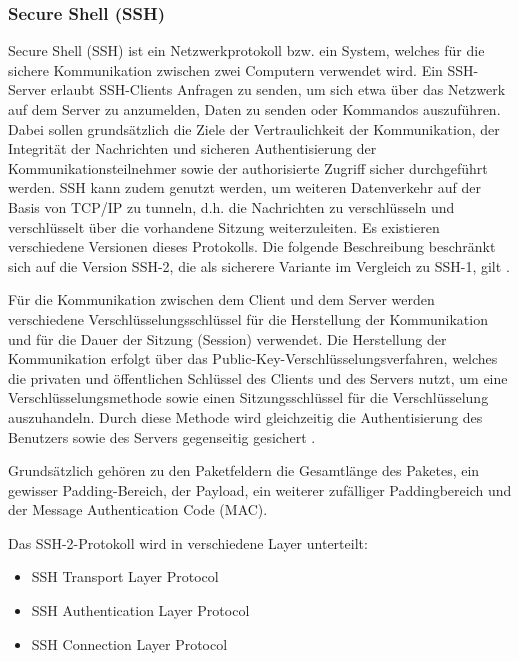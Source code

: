 \subsubsection{Secure Shell (SSH)}
Secure Shell (SSH) ist ein Netzwerkprotokoll bzw. ein System, welches für die sichere Kommunikation zwischen zwei Computern verwendet wird. Ein SSH-Server erlaubt SSH-Clients Anfragen zu senden, um sich etwa über das Netzwerk auf dem Server zu anzumelden, Daten zu senden oder Kommandos auszuführen. Dabei sollen grundsätzlich die Ziele der Vertraulichkeit der Kommunikation, der Integrität der Nachrichten und sicheren Authentisierung der Kommunikationsteilnehmer sowie der authorisierte Zugriff sicher durchgeführt werden. SSH kann zudem genutzt werden, um weiteren Datenverkehr auf der Basis von TCP/IP zu \glqq tunneln\grqq , d.h. die Nachrichten zu verschlüsseln und verschlüsselt über die vorhandene Sitzung weiterzuleiten. Es existieren verschiedene Versionen dieses Protokolls. Die folgende Beschreibung beschränkt sich auf die Version SSH-2, die als sicherere Variante im Vergleich zu SSH-1, gilt \citep{SSH1}.  %

Für die Kommunikation zwischen dem Client und dem Server werden verschiedene Verschlüsselungsschlüssel für die Herstellung der Kommunikation und für die Dauer der Sitzung (Session) verwendet. Die Herstellung der Kommunikation erfolgt über das Public-Key-Verschlüsselungsverfahren, welches die privaten und öffentlichen Schlüssel des Clients und des Servers nutzt, um eine Verschlüsselungsmethode sowie einen Sitzungsschlüssel für die Verschlüsselung auszuhandeln. Durch diese Methode wird gleichzeitig die Authentisierung des Benutzers sowie des Servers gegenseitig gesichert \citep{SSH1}. %


Grundsätzlich gehören zu den Paketfeldern die Gesamtlänge des Paketes, ein gewisser Padding-Bereich, der Payload, ein weiterer zufälliger Paddingbereich und der Message Authentication Code (MAC).\\

Das SSH-2-Protokoll wird in verschiedene Layer unterteilt:
\begin{itemize}
\item SSH Transport Layer Protocol
\item SSH Authentication Layer Protocol
\item SSH Connection Layer Protocol
\end{itemize}

